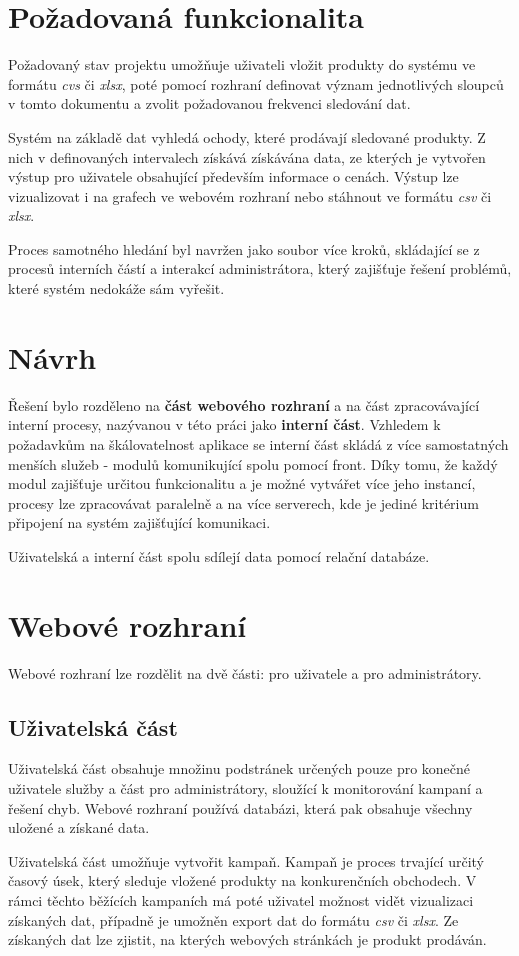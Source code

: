 \documentclass[thesis=B,czech]{FITthesis}[2012/06/26]
\begin{document}
\section{Požadovaná funkcionalita}
Požadovaný stav projektu umožňuje uživateli vložit produkty do systému ve formátu \textit{cvs} či \textit{xlsx}, poté pomocí
rozhraní definovat význam jednotlivých sloupců v tomto dokumentu a zvolit požadovanou frekvenci sledování dat.
\par
Systém na základě dat vyhledá ochody, které prodávají sledované produkty. Z nich v definovaných intervalech získává získávána data, ze kterých je vytvořen výstup pro uživatele obsahující především informace o cenách. Výstup lze vizualizovat i na grafech ve webovém rozhraní nebo stáhnout ve formátu
\textit{csv} či \textit{xlsx}.
\par
Proces samotného hledání byl navržen jako soubor více kroků, skládající se z procesů interních částí a interakcí administrátora, který zajišťuje
řešení problémů, které systém nedokáže sám vyřešit.

\section{Návrh}
Řešení bylo rozděleno na \textbf{část webového rozhraní} a na část zpracovávající interní procesy, nazývanou v této práci 
jako \textbf{interní část}.
Vzhledem k požadavkům na škálovatelnost aplikace se interní část skládá z více samostatných menších služeb - modulů komunikující
spolu pomocí front. Díky tomu, že každý modul zajišťuje určitou funkcionalitu a je možné vytvářet více jeho instancí, procesy lze 
zpracovávat paralelně a na více serverech, kde je jediné kritérium připojení na systém zajišťující komunikaci.
\par
Uživatelská a interní část spolu sdílejí data pomocí relační databáze\cite{DB}.

\section{Webové rozhraní}
Webové rozhraní lze rozdělit na dvě části: pro uživatele a pro administrátory. 

\subsection{Uživatelská část}
Uživatelská část obsahuje množinu podstránek určených pouze pro konečné uživatele
služby a část pro administrátory, sloužící k monitorování kampaní a řešení chyb. Webové rozhraní používá databázi, která pak 
obsahuje všechny uložené a získané data.
\par
Uživatelská část umožňuje vytvořit kampaň. Kampaň je proces trvající určitý časový úsek, který sleduje vložené produkty na konkurenčních
obchodech.
V rámci těchto běžících kampaních má poté uživatel možnost vidět vizualizaci získaných dat, případně je umožněn export dat do formátu
\textit{csv} či \textit{xlsx}. Ze získaných dat lze zjistit, na kterých webových stránkách je produkt prodáván.
\end{document}
